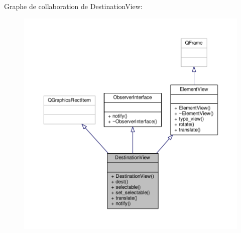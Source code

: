 Graphe de collaboration de Destination\+View\+:
\nopagebreak
\begin{figure}[H]
\begin{center}
\leavevmode
\includegraphics[width=350pt]{d0/d46/classDestinationView__coll__graph}
\end{center}
\end{figure}
